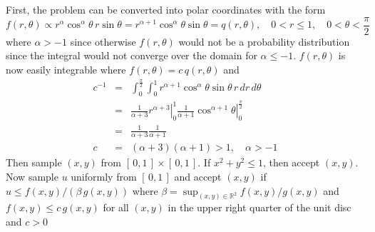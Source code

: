 \documentclass[11pt]{article}
\begin{document}
\section{}

First, the problem can be converted into polar coordinates with the form 
\begin{equation*}
  f\left(r,\theta\right)\propto r^\alpha\cos^\alpha\theta\,r\sin\theta=r^{\alpha+1}\cos^\alpha\theta\sin\theta=q\left(r,\theta\right),\quad 0<r\leq1,\quad 0<\theta<\frac{\pi}{2}
\end{equation*}
where $\alpha>-1$ since otherwise $f(r,\theta)$ would not be a probability distribution since the integral would not converge over the domain for $\alpha\leq-1$. $f(r,\theta)$ is now easily integrable where $f(r,\theta) = c\,q\left(r,\theta\right)$ and
\begin{eqnarray*}
  c^{-1}&=&\int_0^{\frac{\pi}{2}}\int_0^1r^{\alpha+1}\cos^\alpha\theta\sin\theta\,r\,dr\,d\theta\\
        &=&\frac{1}{\alpha+3}\left.r^{\alpha+3}\right\rvert_0^1\frac{1}{\alpha+1}\left.\cos^{\alpha+1}\theta\right\rvert_0^\frac{\pi}{2}\\
        &=&\frac{1}{\alpha+3}\frac{1}{\alpha+1}\\
  c&=&\left(\alpha+3\right)\left(\alpha+1\right)>1,\quad\alpha>-1
\end{eqnarray*}
Then sample $\left(x,y\right)$ from $\left[\,0,1\,\right]\times\left[\,0,1\,\right]$. If $x^2+y^2\leq1$, then accept $\left(x,y\right)$. Now sample $u$ uniformly from $\left[\,0,1\,\right]$ and accept $\left(x,y\right)$ if $u \leq f(x,y)/\left(\beta\,g\left(x,y\right)\right)$ where $\beta=\sup_{(x,y)\in\mathbb{R}^2}f(x,y)/g(x,y)$ and $f(x,y)\leq c\,g(x,y)$ for all $(x,y)$ in the upper right quarter of the unit disc and $c>0$



\end{document}
